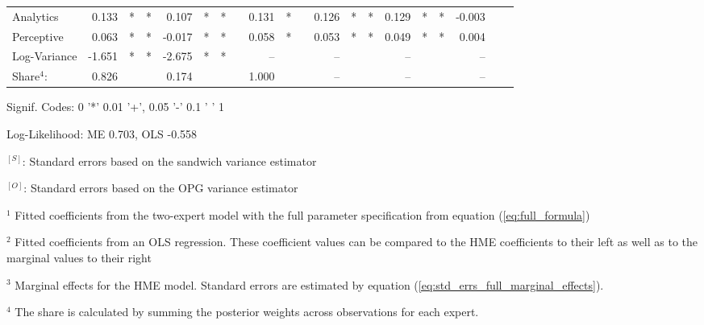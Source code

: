 \documentclass[12pt]{article}
\theoremstyle{definition}
\begin{document}
\begin{landscape}
\begin{table}
\begin{threeparttable}
\begin{tabular}[l]{l r l l r l l c r l c r l l r l l r l l}
  Analytics              &  0.133 & *   & *   &  0.107 & *   & *    &&  0.131 & *     &&  0.126 & *   & *    &  0.129  & *   & *   & -0.003 &     &   \\
  Perceptive             &  0.063 & *   & *   & -0.017 & *   & *    &&  0.058 & *     &&  0.053 & *   & *    &  0.049  & *   & *   &  0.004 &     &   \\
  Log-Variance           & -1.651 & *   & *   & -2.675 & *   & *    &&  --    &       &&  --    &     &      &  --     &     &     &  --    &     &   \\
                  \cmidrule(l){2-4} \cmidrule(l){5-7} \cmidrule(l){9-10} \cmidrule(l){12-14} \cmidrule(l){15-17} \cmidrule(l){18-20}
  Share$^{4}$:           &  0.826 &     &     &  0.174 &     &      &&  1.000 &       &&  --    &     &      &  --     &     &     &  --    &     &   \\
  \hline
        \end{tabular}
        \begin{tablenotes}
          \item Signif. Codes: 0 '*' 0.01 '+', 0.05 '-' 0.1 ' ' 1
          \item Log-Likelihood: ME 0.703, OLS -0.558
          \item $^{[S]}$: Standard errors based on the sandwich variance estimator
          \item $^{[O]}$: Standard errors based on the OPG variance estimator
          \item $^{1}$ Fitted coefficients from the two-expert model with the full parameter specification from equation (\ref{eq:full_formula})
          \item $^{2}$ Fitted coefficients from an OLS regression. These coefficient values can be compared to the HME coefficients to their left as well as to the marginal values to their right
          \item $^{3}$ Marginal effects for the HME model. Standard errors are estimated by equation (\ref{eq:std_errs_full_marginal_effects}).
          \item $^{4}$ The share is calculated by summing the posterior weights across observations for each expert.
        \end{tablenotes} \label{tbl:2E_full_regressions_results}
      \end{threeparttable}
  \end{table}
  \end{landscape}
  
\end{document}

